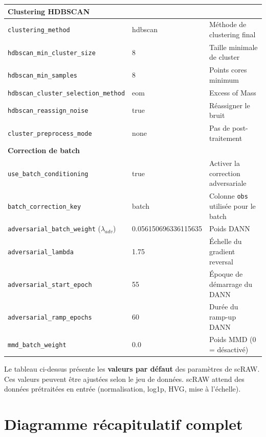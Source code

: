 \documentclass[11pt,a4paper]{article}
\begin{document}
\begin{longtable}{p{4.8cm}p{2.2cm}p{7cm}}
\midrule
\multicolumn{3}{l}{\cellcolor{clustergreen!8}\textbf{Clustering HDBSCAN}} \\
\midrule
\texttt{clustering\_method} & hdbscan & M\'ethode de clustering final \\
\texttt{hdbscan\_min\_cluster\_size} & 8 & Taille minimale de cluster \\
\texttt{hdbscan\_min\_samples} & 8 & Points cores minimum \\
\texttt{hdbscan\_cluster\_selection\_method} & eom & Excess of Mass \\
\texttt{hdbscan\_reassign\_noise} & true & R\'eassigner le bruit \\
\texttt{cluster\_preprocess\_mode} & none & Pas de post-traitement \\

\midrule
\multicolumn{3}{l}{\cellcolor{dannred!8}\textbf{Correction de batch}} \\
\midrule
\texttt{use\_batch\_conditioning} & true & Activer la correction adversariale \\
\texttt{batch\_correction\_key} & batch & Colonne \texttt{obs} utilis\'ee pour le batch \\
\texttt{adversarial\_batch\_weight} ($\lambda_{adv}$) & 0.056150696336115635 & Poids DANN \\
\texttt{adversarial\_lambda} & 1.75 & \'Echelle du gradient reversal \\
\texttt{adversarial\_start\_epoch} & 55 & \'Epoque de d\'emarrage du DANN \\
\texttt{adversarial\_ramp\_epochs} & 60 & Dur\'ee du ramp-up DANN \\
\texttt{mmd\_batch\_weight} & 0.0 & Poids MMD (0 = d\'esactiv\'e) \\


\end{longtable}

\begin{notebox}
Le tableau ci-dessus pr\'esente les \textbf{valeurs par d\'efaut} des param\`etres de scRAW. Ces valeurs peuvent \^etre ajust\'ees selon le jeu de donn\'ees. scRAW attend des donn\'ees pr\'etrait\'ees en entr\'ee (normalisation, log1p, HVG, mise \`a l'\'echelle).
\end{notebox}



\section{Diagramme r\'ecapitulatif complet}
\label{sec:full_diagram}
\end{document}
